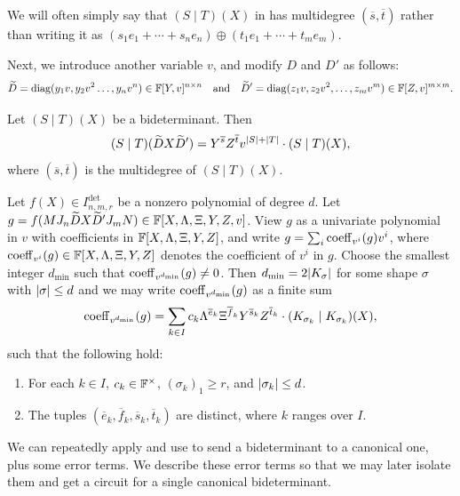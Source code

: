 \documentclass[letterpaper, 11pt]{amsart}
\begin{document}
We will often simply say that $(S \mid T)(X)$ in  has multidegree $(\overline{s}, \overline{t})$ rather than writing it as $(s_1 e_1 + \cdots + s_n e_n) \oplus (t_1 e_1 + \cdots + t_m e_m)$.

Next, we introduce another variable $v$, and modify $D$ and $D'$ as follows:
\[
    \widetilde{D} = \mathrm{diag}(y_1 v, y_2 v^2\dots,y_n v^n )\in\mathbb{F}[Y,v]^{n\times n} \quad\text{and}\quad \widetilde{D}'=\mathrm{diag}(z_1 v,z_2 v^2,\dots,z_m v^m)\in\mathbb{F}[Z,v]^{m\times m}.
\]
\begin{lem}\label{lem:multiply-by-diag}
    Let $(S\mid T)(X)$ be a bideterminant.
    Then
    \[
        (S\mid T)(\widetilde{D} X \widetilde{D}')=Y^{\overline{s}} Z^{\overline{t}} v^{\abs{S} + \abs{T}} \cdot (S\mid T)(X),
    \]
    where $(\overline{s},\overline{t})$ is the multidegree of $(S\mid T)(X)$.
\end{lem}

\begin{lem}\label{lem:key}
Let $f(X) \in I^{\det}_{n, m, r}$ be a nonzero polynomial of degree $d$.
Let $g = f(M J_n \widetilde{D} X \widetilde{D}' J_m N) \in \mathbb{F}[X, \Lambda, \Xi, Y, Z, v]$.
View $g$ as a univariate polynomial in $v$ with coefficients in $\mathbb{F}[X,\Lambda,\Xi,Y,Z]$, and write $g=\sum_{i} \operatorname{coeff}_{v^i}(g) v^i$, where $\operatorname{coeff}_{v^i}(g)\in \mathbb{F}[X,\Lambda,\Xi,Y,Z]$ denotes the coefficient of $v^i$ in $g$.
Choose the smallest integer $d_{\min}$ such that  $\operatorname{coeff}_{v^{d_{\min}}}(g)\neq 0$.
Then $d_{\min}=2 \abs{K_\sigma}$ for some shape $\sigma$ with $\abs{\sigma} \leq d$ and we may write $\operatorname{coeff}_{v^{d_{\min}}}(g)$ as a finite sum
\begin{equation}\label{eq:required}
    \operatorname{coeff}_{v^{d_{\min}}}(g)=\sum_{k\in I} c_k \Lambda^{\overline{e}_k}\Xi^{\overline{f}_k}Y^{\overline{s}_k}Z^{\overline{t}_k}\cdot (K_{\sigma_k}\mid K_{\sigma_k})(X),
\end{equation}
such that the following hold:
\begin{enumerate}
    \item\label{item:required1} For each $k\in I$, $c_k\in\mathbb{F}^\times$,  $(\sigma_k)_1\geq r$, and $\abs{\sigma_k} \leq d$.
    \item\label{item:required2} The tuples $(\overline{e}_k,\overline{f}_k, \overline{s}_k,\overline{t}_k)$ are distinct, where $k$ ranges over $I$.
\end{enumerate}
\end{lem}
\else

We can repeatedly apply  and use  to send a bideterminant to a canonical one, plus some error terms.
We describe these error terms so that we may later isolate them and get a circuit for a single canonical bideterminant.
\end{document}
